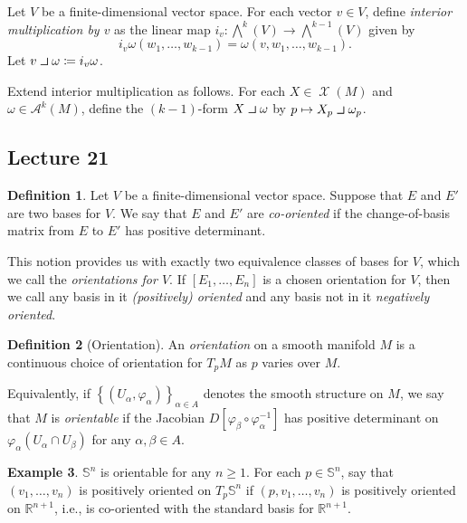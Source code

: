 \documentclass[10pt,letterpaper,cm]{nupset}
\theoremstyle{definition}
\newtheorem{definition}{Definition}[subsection]
\newtheorem{exmp}[definition]{Example}
\theoremstyle{theorem}
\theoremstyle{remark}
\newcommand{\R}{\mathbb R}
\renewcommand{\S}{\mathbb S}
\newcommand{\1}{\mathbf{1}}
\newcommand{\0}{\vec 0}
\newcommand{\intprodl}{%
    \mathbin{\scalebox{1.5}{$\lrcorner$}}%
}
\DeclareMathOperator{\vf}{\mathscr{X}}
\begin{document}
\smallskip

Let $V$ be a finite-dimensional vector space. For each vector $v\in V$, define \textit{interior multiplication by $v$} as the linear map $i_v: \bigwedge^k(V) \to \bigwedge^{k-1}(V)$ given by $$i_v \omega(w_1, \ldots, w_{k-1})= \omega(v, w_1, \ldots, w_{k-1}).$$ Let $v \intprodl \omega \coloneqq  i_v \omega$.

\smallskip
 
 Extend interior multiplication as follows. For each $X \in \vf(M)$ and $\omega \in \mathcal{A}^k(M)$, define the $\left(k-1\right)$-form $X \intprodl \omega$ by $p\mapsto  X_p \intprodl \omega_p$.


\subsection{Lecture 21}

\begin{definition}
Let $V$ be a finite-dimensional vector space. Suppose that $E$ and $E'$ are two bases for $V$. We say that $E$ and $E'$ are \textit{co-oriented} if the change-of-basis matrix from $E$ to $E'$   has positive determinant.
\end{definition}

This notion provides us with exactly two equivalence classes of bases for $V$, which we call the \textit{orientations for $V$}. If $\left[E_1, \ldots, E_n\right]$ is a chosen orientation for $V$, then we call any basis in it \textit{(positively) oriented} and any basis not in it \textit{negatively oriented}.

\begin{definition}[Orientation]
An \textit{orientation} on a smooth manifold $M$ is a continuous choice of orientation for $T_pM$ as $p$ varies over $M$. 
\end{definition}

Equivalently, if $\left\{(U_{\alpha}, \varphi_{\alpha})\right\}_{\alpha \in A}$ denotes the smooth structure on $M$, we say that $M$ is \textit{orientable} if the Jacobian $D\left[\varphi_{\beta} \circ \varphi_{\alpha}^{-1}\right]$ has positive determinant on $\varphi_{\alpha}(U_{\alpha}\cap U_{\beta})$ for any $\alpha, \beta \in A$.


\begin{exmp}
$\S^n$ is orientable for any $n\geq 1$. For each $p \in \S^n$, say that $\left(v_1, \ldots, v_n\right)$ is positively oriented on $T_p\S^n$ if $\left(p, v_1, \ldots, v_n\right)$ is positively oriented on $\R^{n+1}$, i.e., is co-oriented with the standard basis for $\R^{n+1}$.
\end{exmp}
\end{document}
